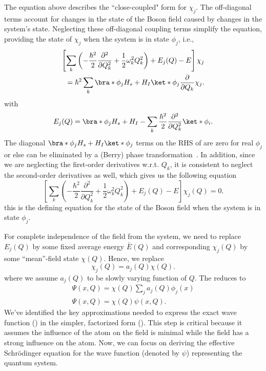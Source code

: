 The equation above describes the ``close-coupled" form for \(\chi_j\). 
The off-diagonal terms account for changes in the state of the Boson field caused by changes in the system's state. Neglecting these 
off-diagonal coupling terms simplify the equation, providing 
the state of \(\chi_j\) when the system is in state \(\phi_j\), i.e., 
\begin{equation}
    \begin{aligned}
        \label{eq:class_jcm_eq6}
    \left[\sum_k \left(-\frac{\hbar^2}{2}\dfrac{\partial^2}{\partial Q_k^2}
    + \frac{1}{2} \omega_k^2 Q_k^2\right)
    + E_j(Q) - E \right]\chi_j \\
    = \hbar^2 \sum_k \bra*{\phi_j}H_s + H_I \ket*{\phi_j}\dfrac{\partial}{\partial Q_k}\chi_j.
    \end{aligned}
\end{equation}
with 
\begin{eqnarray}
    E_j(Q) = \bra*{\phi_j}H_s + H_I - \sum_k \frac{\hbar^2}{2} \dfrac{\partial^2}{\partial Q_k^2} \ket*{\phi_i}.
\end{eqnarray}
The diagonal \(\bra*{\phi_j}H_s + H_I \ket*{\phi_j}\) terms on the RHS of 
are zero for real \(\phi_j\) or else can be eliminated by a (Berry) phase transformation~\cite{braun2004classical}.
In addition, since we are neglecting the first-order derivatives w.r.t. $Q_k$, it is consistent to neglect
the second-order derivatives as well, which gives us the following equation
\begin{equation}
    \label{eq:class_jcm_eq7}
    \left[\sum_k \left(-\frac{\hbar^2}{2}\dfrac{\partial^2}{\partial Q_k^2}
    + \frac{1}{2} \omega_k^2 Q_k^2\right)
    + E_j(Q) - E \right]\chi_j (Q)= 0.
\end{equation}
this is the defining equation for the state of the Boson field when the system is in state \(\phi_j\).

For complete independence of the field from the system, we need to replace 
\(E_j(Q)\) by some fixed average energy \(\bar{E}(Q)\) and corresponding 
\(\chi_j(Q)\) by some ``mean''-field state \({\chi}(Q)\). Hence, we replace 
\begin{equation}
    \label{eq:class_jcm_eq8}
    \chi_j(Q) = a_j(Q) \chi(Q).
\end{equation}
where we assume \(a_j(Q)\) to be slowly varying function of \(Q\). The 
reduces to
\begin{align}
    \label{eq:class_jcm_eq9}
    \Psi(x, Q) = \chi(Q) \sum_j a_j(Q) \phi_j(x) \nonumber \\
    \Psi(x, Q) =  \chi(Q)  \psi(x, Q).
\end{align}
We've identified the key approximations needed to express the exact wave function 
() in the simpler, factorized form (). 
This step is critical because it assumes the influence of the atom on the field is minimal while the 
field has a strong influence on the atom. Now, we can focus on deriving the effective 
Schrödinger equation for the wave function (denoted by \(\psi\)) representing the quantum system.


